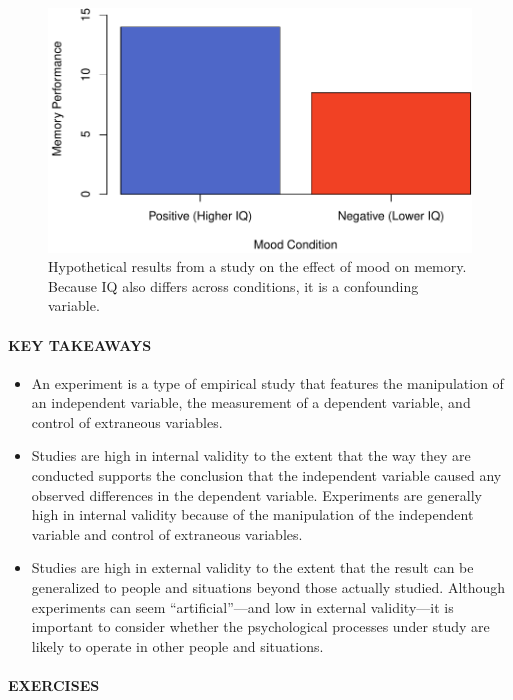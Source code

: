 \documentclass[
]{krantz}
\providecommand{\tightlist}{%
  \setlength{\itemsep}{0pt}\setlength{\parskip}{0pt}}
\begin{document}
\begin{figure}

{\centering \includegraphics[width=0.7\linewidth]{05-experiments_files/figure-latex/confound-1} 

}

\caption{Hypothetical results from a study on the effect of mood on memory. Because IQ also differs across conditions, it is a confounding variable.}\label{fig:confound}
\end{figure}

\hypertarget{key-takeaways-11}{%
\paragraph*{KEY TAKEAWAYS}\label{key-takeaways-11}}

\begin{itemize}
\tightlist
\item
  An experiment is a type of empirical study that features the manipulation of an independent variable, the measurement of a dependent variable, and control of extraneous variables.
\item
  Studies are high in internal validity to the extent that the way they are conducted supports the conclusion that the independent variable caused any observed differences in the dependent variable. Experiments are generally high in internal validity because of the manipulation of the independent variable and control of extraneous variables.
\item
  Studies are high in external validity to the extent that the result can be generalized to people and situations beyond those actually studied. Although experiments can seem ``artificial''---and low in external validity---it is important to consider whether the psychological processes under study are likely to operate in other people and situations.
\end{itemize}

\hypertarget{exercises-10}{%
\paragraph*{EXERCISES}\label{exercises-10}}
\end{document}
